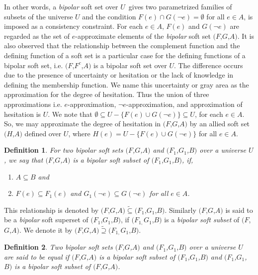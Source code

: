 \documentclass{amsart}
\theoremstyle{plain}
\newtheorem{definition}{Definition}
\numberwithin{equation}{section}
\begin{document}
In other words, a \textit{bipolar} soft set over $U$\ gives two parametrized
families of subsets of the universe $U$ and the condition $F(e)\cap G(\lnot
e)=\emptyset $ for all $e\in A$, is imposed as a consistency constraint. For
each $e\in A$, $F(e)$ and $G(\lnot e)$ are regarded as the set of $e$-approximate elements of the \textit{bipolar} soft set $(F$,$G$,$A)$. It is
also observed that the relationship between the complement function and the
defining function of a soft set is a particular case for the defining
functions of a bipolar soft set, i.e. $(F$,$F^{c}$,$A)$ is a bipolar soft
set over $U$. The difference occurs due to the presence of uncertainty or
hesitation or the lack of knowledge in defining the membership function. We
name this uncertainty or gray area as the approximation for the degree of
hesitation. Thus the union of three approximations i.e. $e$-approximation, $\lnot e$-approximation, and approximation of hesitation is $U$. We note that 
$\emptyset \subseteq U-\{F(e)\cup G(\lnot e)\}\subseteq U$, for each $e\in A$. So, we may approximate the degree of hesitation in $(F$,$G$,$A)$ by an
allied soft set $(H$,$A)$ defined over $U$, where $H(e)=U-\{F(e)\cup G(\lnot
e)\}$ for all $e\in A$.

\begin{definition}
For two \textit{bipolar} soft sets $(F$,$G$,$A)$ and $(F_{1}$,$G_{1}$,$B)$
over a universe $U$, we say that $(F$,$G$,$A)$ is a \textit{bipolar} soft
subset of $(F_{1}$,$G_{1}$,$B)$, if,

\begin{enumerate}
\item $A\subseteq B$ and

\item $F(e)\subseteq F_{1}(e)$ and $G_{1}(\lnot e)\subseteq G(\lnot e)$ for
all $e\in A$.
\end{enumerate}
\end{definition}

This relationship is denoted by $(F$,$G$,$A)\tilde{\subseteq}(F_{1}$,$G_{1}$,$B)$. Similarly $(F$,$G$,$A)$ is said to be a \textit{bipolar} soft superset
of $(F_{1}$,$G_{1}$,$B)$, if $(F_{1,}G_{1}$,$B)$ is a \textit{bipolar soft
subset} of $(F$,$G$,$A)$. We denote it by $(F$,$G$,$A)\tilde{\supseteq}(F_{1,}G_{1}$,$B)$.

\begin{definition}
Two \textit{bipolar} soft sets $(F$,$G$,$A)$ and $(F_{1}$,$G_{1}$,$B)$ over
a universe $U$ are said to be \textit{equal} if $(F$,$G$,$A)$ is a \textit{bipolar} soft subset of $(F_{1}$,$G_{1}$,$B)$ and $(F_{1}$,$G_{1}$,$B)$ is a 
\textit{bipolar} soft subset of $(F$,$G$,$A)$.
\end{definition}
\end{document}
